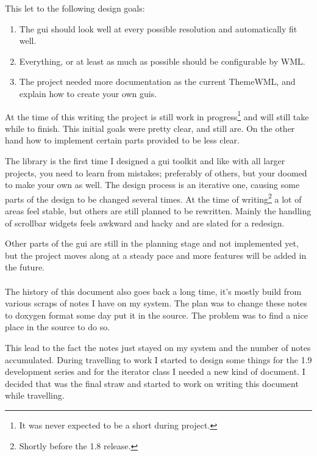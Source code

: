\documentclass[a4paper,notitlepage]{report}
\begin{document}
This let to the following design goals:

\begin{enumerate}
\item The gui should look well at every possible resolution and automatically
	fit well.
\item Everything, or at least as much as possible should be configurable by WML.
\item The project needed more documentation as the current ThemeWML, and explain
	how to create your own guis.
\end{enumerate}

At the time of this writing the project is still work in progress\footnote{It
was never expected to be a short during project.} and will still take while to
finish. This initial goals were pretty clear, and still are. On the other hand
how to implement certain parts provided to be less clear.

The library is the first time I designed a gui toolkit and like with all larger
projects, you need to learn from mistakes; preferably of others, but your doomed
to make your own as well. The design process is an iterative one, causing some
parts of the design to be changed several times. At the time of
writing\footnote{Shortly before the 1.8 release.} a lot of areas feel stable,
but others are still planned to be rewritten. Mainly the handling of scrollbar
widgets feels awkward and hacky and are slated for a redesign.

Other parts of the gui are still in the planning stage and not implemented yet,
but the project moves along at a steady pace and more features will be added in
the future.

\paragraph{}

The history of this document also goes back a long time, it's mostly build from
various scraps of notes I have on my system. The plan was to change these notes
to doxygen format some day put it in the source. The problem was to find a nice
place in the source to do so.

This lead to the fact the notes just stayed on my system and the number of
notes accumulated. During travelling to work I started to design some things for
the 1.9 development series and for the iterator class I needed a new kind of
document. I decided that was the final straw and started to work on writing this
document while travelling.
\end{document}
